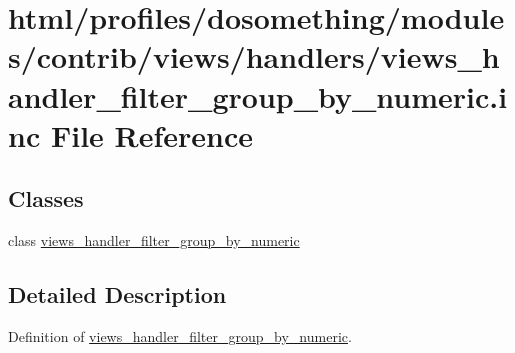 \hypertarget{views__handler__filter__group__by__numeric_8inc}{
\section{html/profiles/dosomething/modules/contrib/views/handlers/views\_\-handler\_\-filter\_\-group\_\-by\_\-numeric.inc File Reference}
\label{views__handler__filter__group__by__numeric_8inc}
}
\subsection*{Classes}
\begin{DoxyCompactItemize}
\item 
class \hyperlink{classviews__handler__filter__group__by__numeric}{views\_\-handler\_\-filter\_\-group\_\-by\_\-numeric}
\end{DoxyCompactItemize}


\subsection{Detailed Description}
Definition of \hyperlink{classviews__handler__filter__group__by__numeric}{views\_\-handler\_\-filter\_\-group\_\-by\_\-numeric}. 